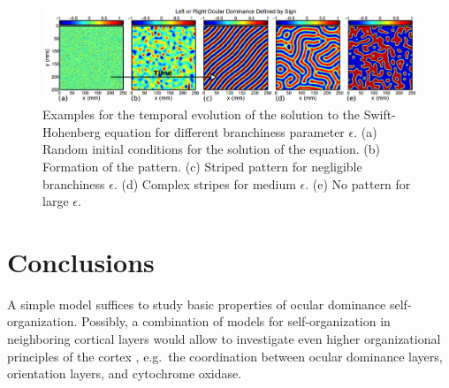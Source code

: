 \documentclass[twocolumn]{bmcart}%
\begin{document}
\begin{figure}[h!]
  \includegraphics[width=.98\textwidth]{ocular_dominace.png}
  \caption{\label{centfig} Examples for the temporal evolution of the 
           solution to the Swift-Hohenberg equation for different 
           branchiness parameter \(\epsilon\).  (a) Random initial 
           conditions for the solution of the equation. (b) Formation of 
           the pattern. (c) Striped pattern for negligible branchiness 
           \(\epsilon\). (d) Complex stripes for medium \(\epsilon\). (e)
           No pattern for large \(\epsilon\).}
\end{figure}

\section{Conclusions}\label{conclusions}

A simple model suffices to study basic properties of ocular dominance
self-organization. Possibly, a combination of models for
self-organization in neighboring cortical layers would allow to
investigate even higher organizational principles of the cortex
\cite{Reichl2012}, e.g.~the coordination between ocular dominance layers,
orientation layers, and cytochrome oxidase.

\end{document}
